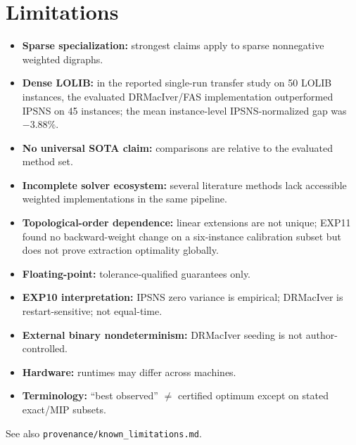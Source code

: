 \section{Limitations}
\label{sec:or1-limits}

\begin{itemize}
  \item \textbf{Sparse specialization:} strongest claims apply to sparse nonnegative weighted digraphs.
  \item \textbf{Dense LOLIB:} in the reported single-run transfer study on 50 LOLIB instances, the evaluated DRMacIver/FAS implementation outperformed IPSNS on 45 instances; the mean instance-level IPSNS-normalized gap was $-3.88\%$.
  \item \textbf{No universal SOTA claim:} comparisons are relative to the evaluated method set.
  \item \textbf{Incomplete solver ecosystem:} several literature methods lack accessible weighted implementations in the same pipeline.
  \item \textbf{Topological-order dependence:} linear extensions are not unique; EXP11 found no backward-weight change on a six-instance calibration subset but does not prove extraction optimality globally.
  \item \textbf{Floating-point:} tolerance-qualified guarantees only.
  \item \textbf{EXP10 interpretation:} IPSNS zero variance is empirical; DRMacIver is restart-sensitive; not equal-time.
  \item \textbf{External binary nondeterminism:} DRMacIver seeding is not author-controlled.
  \item \textbf{Hardware:} runtimes may differ across machines.
  \item \textbf{Terminology:} ``best observed'' $\neq$ certified optimum except on stated exact/MIP subsets.
\end{itemize}

See also \texttt{provenance/known\_limitations.md}.
